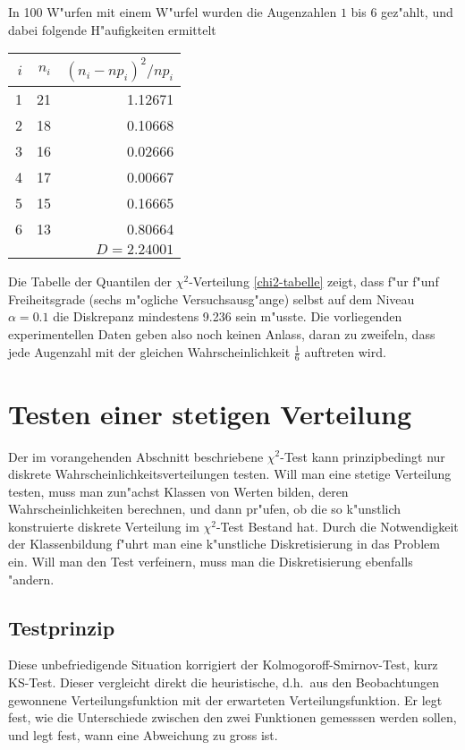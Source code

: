 In 100 W"urfen mit einem W"urfel wurden die Augenzahlen $1$ bis $6$ gez"ahlt,
und dabei folgende H"aufigkeiten ermittelt
\begin{center}
\begin{tabular}{|r|r|r|}
\hline
$i$&$n_i$&$(n_i-np_i)^2/np_i$\\
\hline
1&21&1.12671\\
2&18&0.10668\\
3&16&0.02666\\
4&17&0.00667\\
5&15&0.16665\\
6&13&0.80664\\
\hline
&&$D=2.24001$\\
\hline
\end{tabular}
\end{center}
Die Tabelle der Quantilen der $\chi^2$-Verteilung \ref{chi2-tabelle}
zeigt, dass f"ur f"unf Freiheitsgrade (sechs m"ogliche Versuchsausg"ange)
selbst auf dem Niveau $\alpha=0.1$ die Diskrepanz mindestens 9.236 sein
m"usste. Die vorliegenden experimentellen Daten geben also noch keinen
Anlass, daran zu zweifeln, dass jede Augenzahl mit der gleichen
Wahrscheinlichkeit $\frac16$ auftreten wird.

\section{Testen einer stetigen Verteilung}
\label{section-testen-stetiger-wkeitsverteilung}
Der im vorangehenden Abschnitt beschriebene $\chi^2$-Test kann prinzipbedingt
nur diskrete Wahrscheinlichkeitsverteilungen testen. Will man eine stetige
Verteilung testen, muss man zun"achst Klassen von Werten bilden,
deren Wahrscheinlichkeiten berechnen, und dann pr"ufen, ob die so
k"unstlich konstruierte diskrete Verteilung im $\chi^2$-Test Bestand hat.
Durch die Notwendigkeit der Klassenbildung f"uhrt man eine k"unstliche
Diskretisierung in das Problem ein. Will man den Test verfeinern, muss man
die Diskretisierung ebenfalls "andern.

\subsection{Testprinzip}
Diese unbefriedigende Situation korrigiert der Kolmogoroff-Smirnov-Test,
kurz KS-Test.
Dieser vergleicht direkt die heuristische, d.h.~aus den Beobachtungen gewonnene
Verteilungsfunktion mit der erwarteten Verteilungsfunktion. Er legt fest,
wie die Unterschiede zwischen den zwei Funktionen gemesssen werden sollen,
und legt fest, wann eine Abweichung zu gross ist.

